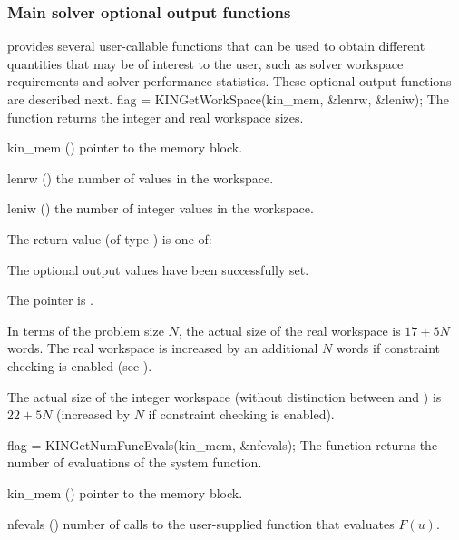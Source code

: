 \subsubsection{Main solver optional output functions}\label{sss:output_main}
{\kinsol} provides several user-callable functions that can be used to obtain
different quantities that may be of interest to the user, such as solver workspace
requirements and solver performance statistics.
These optional output functions are described next.
{
  flag = KINGetWorkSpace(kin\_mem, \&lenrw, \&leniw);
}
{
  The function  returns the
  {\kinsol} integer and real workspace sizes.
}
{
  \begin{args}
  \item[kin\_mem] ()
    pointer to the {\kinsol} memory block.
  \item[lenrw] ()
    the number of  values in the {\kinsol} workspace.
  \item[leniw] ()
    the number of integer values in the {\kinsol} workspace.
  \end{args}
}
{
  The return value  (of type ) is one of:
  \begin{args}
  \item[\Id{KIN\_SUCCESS}]
    The optional output values have been successfully set.
  \item[\Id{KIN\_MEM\_NULL}]
    The  pointer is .
  \end{args}
}
{
  In terms of the problem size $N$, the actual size of the real workspace
  is $17 + 5 N$  words. The real workspace is increased by
  an additional $N$ words if constraint checking is enabled (see ).

  The actual size of the integer workspace (without distinction between 
  and ) is $22 + 5 N$ (increased by $N$ if constraint checking is enabled).
}
{
  flag = KINGetNumFuncEvals(kin\_mem, \&nfevals);
}
{
  The function  returns the number of evaluations
  of the system function.
}
{
  \begin{args}
  \item[kin\_mem] ()
    pointer to the {\kinsol} memory block.
  \item[nfevals] ()
    number of calls to the user-supplied function that evaluates $F(u)$.
  \end{args}
}
